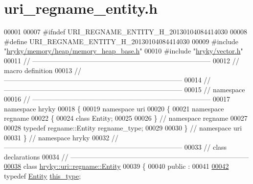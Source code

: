 \hypertarget{uri__regname__entity_8h_source}{\section{uri\-\_\-regname\-\_\-entity.\-h}
}

\begin{DoxyCode}
00001 
00007 \textcolor{preprocessor}{#ifndef URI\_REGNAME\_ENTITY\_H\_20130104084414030}
00008 \textcolor{preprocessor}{}\textcolor{preprocessor}{#define URI\_REGNAME\_ENTITY\_H\_20130104084414030}
00009 \textcolor{preprocessor}{}\textcolor{preprocessor}{#include "\hyperlink{memory__heap__base_8h}{hryky/memory/heap/memory_heap_base.h}"}
00010 \textcolor{preprocessor}{#include "\hyperlink{vector_8h}{hryky/vector.h}"}
00011 \textcolor{comment}{//
      ------------------------------------------------------------------------------}
00012 \textcolor{comment}{// macro definition}
00013 \textcolor{comment}{//
      ------------------------------------------------------------------------------}
00014 \textcolor{comment}{//
      ------------------------------------------------------------------------------}
00015 \textcolor{comment}{// namespace}
00016 \textcolor{comment}{//
      ------------------------------------------------------------------------------}
00017 \textcolor{keyword}{namespace }hryky
00018 \{
00019 \textcolor{keyword}{namespace }uri
00020 \{
00021 \textcolor{keyword}{namespace }regname
00022 \{
00024     \textcolor{keyword}{class }Entity;
00025 
00026 \} \textcolor{comment}{// namespace regname}
00027 
00028 \textcolor{keyword}{typedef} regname::Entity regname\_type;
00029 
00030 \} \textcolor{comment}{// namespace uri}
00031 \} \textcolor{comment}{// namespace hryky}
00032 \textcolor{comment}{//
      ------------------------------------------------------------------------------}
00033 \textcolor{comment}{// class declarations}
00034 \textcolor{comment}{//
      ------------------------------------------------------------------------------}
\hypertarget{uri__regname__entity_8h_source_l00038}{}\hyperlink{classhryky_1_1uri_1_1regname_1_1_entity}{00038} \textcolor{comment}{}\textcolor{keyword}{class }\hyperlink{classhryky_1_1uri_1_1regname_1_1_entity}{hryky::uri::regname::Entity}
00039 \{
00040 \textcolor{keyword}{public} :
00041 
\hypertarget{uri__regname__entity_8h_source_l00042}{}\hyperlink{classhryky_1_1uri_1_1regname_1_1_entity_ab3e7322abf5cdcaca367ea56179c1862}{00042}     \textcolor{keyword}{typedef} \hyperlink{classhryky_1_1uri_1_1regname_1_1_entity}{Entity} \hyperlink{classhryky_1_1uri_1_1regname_1_1_entity_ab3e7322abf5cdcaca367ea56179c1862}{this_type};

\end{DoxyCode}
